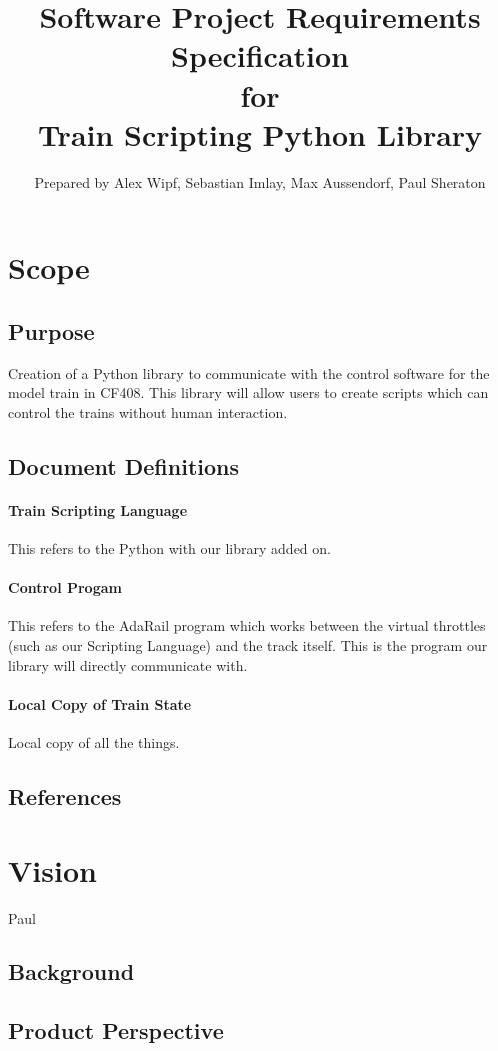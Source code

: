 \documentclass[a4paper,11pt,notitlepage]{article}
\title{{\bf Software Project Requirements Specification} \\ for \\ {\bf Train Scripting Python Library}}
\author{Prepared by Alex Wipf, Sebastian Imlay, Max Aussendorf, Paul Sheraton}
\def\TSL{Train Scripting Language\xspace}
\def\CS{Control Progam\xspace}
\def\LC{Local Copy of Train State\xspace}
\begin{document}
\maketitle
\pagebreak
\tableofcontents

\section{Scope}
\subsection{Purpose}
Creation of a Python library to communicate with the control software for the model train in CF408. This library will allow users to create scripts which can control the trains without human interaction.
\subsection{Document Definitions}
\paragraph{\TSL} This refers to the Python with our library added on.
\paragraph{\CS} This refers to the AdaRail program which works between the virtual throttles (such as our Scripting Language) and the track itself. This is the program our library will directly communicate with.
\paragraph{\LC} Local copy of all the things.
\subsection{References}

\section{Vision}
Paul
\subsection{Background}
\subsection{Product Perspective}
\end{document}
